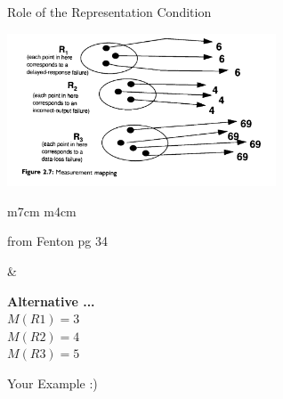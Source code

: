 \documentclass{beamer}
\begin{document}
\begin{frame}{\centerline{Role of the Representation Condition}}



\includegraphics[width=80mm]{A2022.IDSEPC.SperimentazioneDeduzione/img-img12.png}

\begin{table}[H]
\begin{tabulary}{\textwidth}{m{7cm} m{4cm}}
\begin{small}
\begin{center}
from Fenton pg 34
\end{center}
\end{small}&
\begin{tcolorbox}
\textbf{Alternative ...}\\
\(M(R1) = 3\)\\
\(M(R2) = 4\)\\
\(M(R3) = 5\)
\end{tcolorbox}

\end{tabulary}
\end{table}


\end{frame}

\begin{frame}{\centerline{}}


\begin{center}
{\Large
Your Example :)
}
\end{center}


\end{frame}
\end{document}
